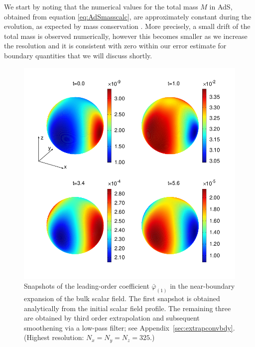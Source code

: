 \documentclass[a4paper,11pt]{article}
\numberwithin{equation}{section}
\begin{document}
We start by noting that the numerical values for the total mass $M$ in AdS, obtained from equation \eqref{eq:AdSmasscalc}, are approximately constant during the evolution, as expected by mass conservation \cite{Fischetti:2012rd}. More precisely, a small drift of  the total mass  is observed numerically, however this becomes smaller as we increase the resolution and it is consistent with zero within our error estimate for boundary quantities that we will discuss shortly.

\begin{figure}[!h]
        \centering
        \includegraphics[width=5.0in,clip=true]{plots/bdyplots/L3/bdyphi/sphereplots_bdyphi_L3_2by2.png}
\parbox{5.0in}{\caption{
Snapshots of the leading-order coefficient $\bar{\varphi}_{(1)}$ in the near-boundary expansion of the bulk scalar field. 
The first snapshot is obtained analytically from the initial scalar field profile. The remaining three are obtained by third order extrapolation and subsequent smoothening via a low-pass filter;
see Appendix~\ref{sec:extrapconvbdy}. (Highest resolution: $N_x=N_y=N_z=325$.)
        }\label{fig:snapshotsbdyphi}}
\end{figure}
\end{document}
